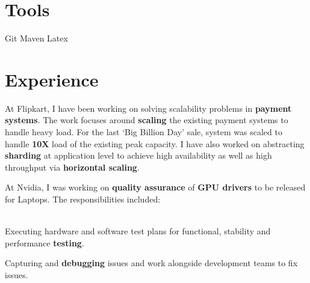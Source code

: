 \documentclass[12pt, a4paper]{deedy-resume}
\begin{document}
\begin{minipage}[t]{0.29\textwidth}
\section{Tools}
Git \textbullet{} Maven \textbullet{} Latex

\sectionspace %


\end{minipage} %
\hfill \vrule \hfill
%
%
\begin{minipage}[t]{0.68\textwidth} %

\section{Experience}

\vspace{\topsep} %
At Flipkart, I have been working on solving scalability problems in \textbf{payment systems}. The work focuses around \textbf{scaling} the existing payment systems to handle heavy load. For the last `Big Billion Day' sale, system was scaled to handle \textbf{10X} load of the existing peak capacity.
I have also worked on abstracting \textbf{sharding} at application level to achieve high availability as well as high throughput via \textbf{horizontal scaling}.

\sectionspace %



\vspace{\topsep}
At Nvidia, I was working on \textbf{quality assurance} of \textbf{GPU drivers} to be released for Laptops. The responsibilities included: \\~\\
\begin{tightitemize}
\item Executing hardware and software test plans for functional, stability and performance \textbf{testing}.
\item Capturing and \textbf{debugging} issues and work alongside development teams to fix issues.
\end{tightitemize}


\end{minipage}
\end{document}
